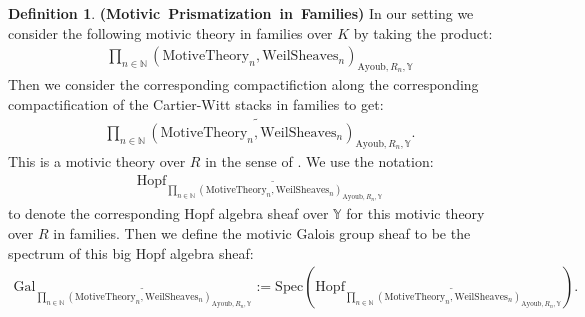 \documentclass[12pt]{article}
\theoremstyle{definition}
\newtheorem{definition}{Definition}
\begin{document}
\begin{definition} \mbox{\textbf{(Motivic Prismatization in Families)}}
In our setting we consider the following motivic theory in families over $K$ by taking the product:
\begin{align}
\prod_{n\in \mathbb{N}} (\mathrm{MotiveTheory}_{n}, \mathrm{WeilSheaves}_n)_{\mathrm{Ayoub}, R_n,\mathbb{Y}}
\end{align}
Then we consider the corresponding compactifiction along the corresponding compactification of the Cartier-Witt stacks in families to get:
\begin{align}
\widetilde{\prod_{n\in \mathbb{N}} (\mathrm{MotiveTheory}_{n}, \mathrm{WeilSheaves}_n)_{\mathrm{Ayoub}, R_n,\mathbb{Y}}}.
\end{align}
This is a motivic theory over $R$ in the sense of \cite{2A}. We use the notation:
\begin{align}
\mathrm{Hopf}_{\widetilde{\prod_{n\in \mathbb{N}} (\mathrm{MotiveTheory}_{n}, \mathrm{WeilSheaves}_n)_{\mathrm{Ayoub}, R_n,\mathbb{Y}}}}
\end{align}
to denote the corresponding Hopf algebra sheaf over $\mathbb{Y}$ for this motivic theory over $R$ in families. Then we define the motivic Galois group sheaf to be the spectrum of this big Hopf algebra sheaf:
\begin{align}
\mathrm{Gal}_{\widetilde{\prod_{n\in \mathbb{N}} (\mathrm{MotiveTheory}_{n}, \mathrm{WeilSheaves}_n)_{\mathrm{Ayoub}, R_n,\mathbb{Y}}}}:= \mathrm{Spec}(\mathrm{Hopf}_{\widetilde{\prod_{n\in \mathbb{N}} (\mathrm{MotiveTheory}_{n}, \mathrm{WeilSheaves}_n)_{\mathrm{Ayoub}, R_n,\mathbb{Y}}}}).
\end{align}
\end{definition}
\end{document}
